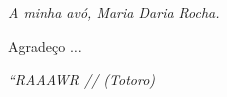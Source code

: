 \documentclass[
12pt,        %
openright,   %
twoside,     %
a4paper,     %
brazil,       %
english       %
%
%
]{ppgca}
\begin{document}







\begin{dedicatoria}
   \vspace*{\fill}
   \centering
   \noindent
   \textit{A minha avó, Maria Daria Rocha.} \vspace*{\fill}
\end{dedicatoria}

\begin{agradecimentos}
Agradeço $\ldots$
\end{agradecimentos}

\begin{epigrafe}
    \vspace*{\fill}
        \begin{flushright}
                \textit{``RAAAWR //
                          (Totoro)}
        \end{flushright}
\end{epigrafe}
\end{document}
